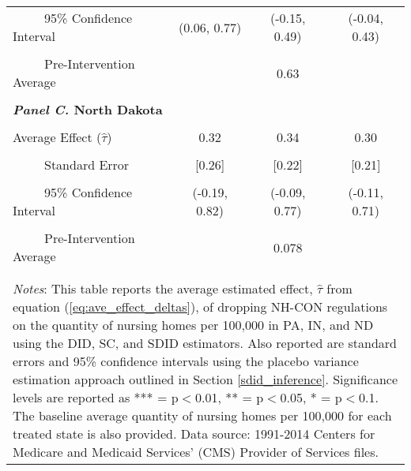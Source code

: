 \documentclass[../Main.tex]{subfiles}
\begin{document}
\begin{table}[htbp]
\begin{tabular}{l*{3}{c}}
\\[-2ex]
\multicolumn{1}{l}{\ \ \ \ \ 95\% Confidence Interval}&   \multicolumn{1}{c}{(0.06, 0.77)}&   \multicolumn{1}{c}{(-0.15, 0.49)}&   \multicolumn{1}{c}{(-0.04, 0.43)}\\
\\[-2ex]
\multicolumn{1}{l}{\ \ \ \ \ Pre-Intervention Average}&   \multicolumn{3}{c}{0.63}\\
\\[-.1ex]
\multicolumn{4}{l}{\textbf{\textit{Panel C.} North Dakota}}\\
\\[-1.5ex]
\multicolumn{1}{l}{Average Effect ($\hat{\tau}$)}&   \multicolumn{1}{c}{0.32}&   \multicolumn{1}{c}{0.34}&  \multicolumn{1}{c}{0.30}\\
\\[-2ex]
\multicolumn{1}{l}{\ \ \ \ \ Standard Error}  &\multicolumn{1}{c}{[0.26]}&\multicolumn{1}{c}{[0.22]}&\multicolumn{1}{c}{[0.21]}\\
\\[-2ex]
\multicolumn{1}{l}{\ \ \ \ \ 95\% Confidence Interval}&   \multicolumn{1}{c}{(-0.19, 0.82)}&   \multicolumn{1}{c}{(-0.09, 0.77)}&   \multicolumn{1}{c}{(-0.11, 0.71)}\\
\\[-2ex]
\multicolumn{1}{l}{\ \ \ \ \ Pre-Intervention Average}&   \multicolumn{3}{c}{0.078}\\
\\[-.1ex]
\hline\hline
\\[-2ex]
\multicolumn{4}{p{.69\linewidth}}{\footnotesize \textit{Notes}: This table reports the average estimated effect, $\hat{\tau}$ from equation (\ref{eq:ave_effect_deltas}), of dropping NH-CON regulations on the quantity of nursing homes per 100,000 in PA, IN, and ND using the DID, SC, and SDID estimators. Also reported are standard errors and 95\% confidence intervals using the placebo variance estimation approach outlined in Section \ref{sdid_inference}. Significance levels are reported as *** = p$<$0.01, ** = p$<$0.05, * = p$<$0.1. The baseline average quantity of nursing homes per 100,000 for each treated state is also provided. Data source: 1991-2014 Centers for Medicare and Medicaid Services’ (CMS) Provider of Services files.}
\end{tabular}
\end{table}
\vfill
\clearpage
\end{document}
